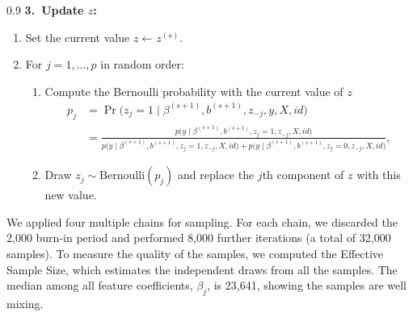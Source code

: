 \documentclass[10pt,a4paper]{article}
\begin{document}
\begin{algobox}
\begin{spacing}{0.9}
\medskip
\noindent\textbf{3.\ Update $z$:}
\begin{enumerate}[itemsep=2pt, topsep=2pt, leftmargin=*]
  \item Set the current value $z \leftarrow z^{(s)}$.
  \item For $j=1,\dots,p$ in random order:
  \begin{enumerate}[itemsep=1pt, topsep=1pt, leftmargin=*]
    \item Compute the Bernoulli probability with the current value of $z$
      \begin{align*}
        p_j
        &= \Pr\bigl(z_j=1 \mid \beta^{(s+1)},b^{(s+1)}, z_{-j}, y, X, id\bigr)\\
        &= \frac{p\bigl(y \mid \beta^{(s+1)}, b^{(s+1)},
                           z_j=1, z_{-j}, X, id\bigr)}
               {p\bigl(y \mid \beta^{(s+1)}, b^{(s+1)},
                           z_j=1, z_{-j}, X, id\bigr)
                + p\bigl(y \mid \beta^{(s+1)}, b^{(s+1)},
                           z_j=0, z_{-j}, X, id\bigr)},
      \end{align*}
    \item Draw $z_j \sim \mathrm{Bernoulli}(p_j)$ and replace the $j$th component of $z$ with this new value.
  \end{enumerate}
\end{enumerate}

\end{spacing}
\endgroup
\end{algobox}
We applied four multiple chains for sampling. For each chain, we discarded the 2,000 burn-in period and performed 8,000 further iterations (a total of 32,000 samples). To measure the quality of the samples, we computed the Effective Sample Size, which estimates the independent draws from all the samples. The median among all feature coefficients, $\beta_j$, is 23,641, showing the samples are well mixing.
\end{document}
